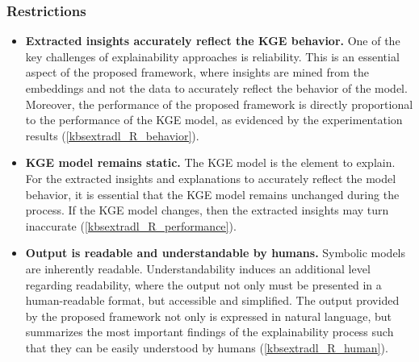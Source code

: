 \subsubsection*{Restrictions}
\begin{itemize}
    \item \textbf{Extracted insights accurately reflect the KGE behavior.} One of the key challenges of explainability approaches is reliability. This is an essential aspect of the proposed framework, where insights are mined from the embeddings and not the data to accurately reflect the behavior of the model. Moreover, the performance of the proposed framework is directly proportional to the performance of the KGE model, as evidenced by the experimentation results (\ref{kbsextradl_R_behavior}). 
    
    \item \textbf{KGE model remains static.} The KGE model is the element to explain. For the extracted insights and explanations to accurately reflect the model behavior, it is essential that the KGE model remains unchanged during the process. If the KGE model changes, then the extracted insights may turn inaccurate (\ref{kbsextradl_R_performance}). 
    
    \item \textbf{Output is readable and understandable by humans.} Symbolic models are inherently readable. Understandability induces an additional level regarding readability, where the output not only must be presented in a human-readable format, but accessible and simplified. The output provided by the proposed framework not only is expressed in natural language, but summarizes the most important findings of the explainability process such that they can be easily understood by humans (\ref{kbsextradl_R_human}). 
\end{itemize}

